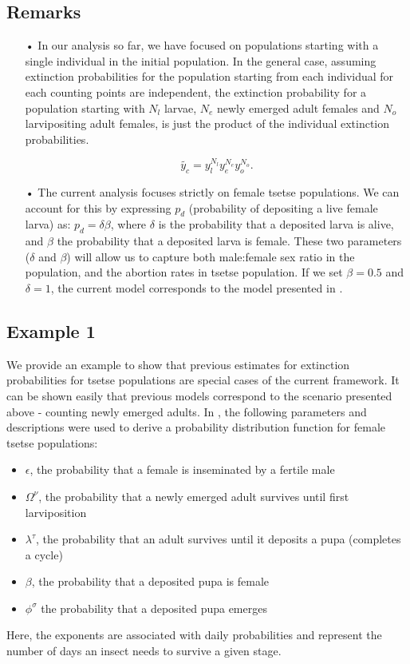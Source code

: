 \documentclass[smallextended]{svjour3}
\begin{document}
	\subsection*{\bf Remarks}
	\begin{itemize}
		\item[•] In our analysis so far, we have focused on populations starting with a single individual in the initial population. In the general case, assuming extinction probabilities for the population starting from each individual for each counting points are independent, the extinction probability for a population starting with $N_l$ larvae, $N_e$ newly emerged adult females and $N_o$ larvipositing adult females, is just the product of the individual extinction probabilities. 
		
		$$\tilde{y_c}=y_l^{N_l} y_e^{N_e} y_o^{N_o}.$$
		
		\item[•] The current analysis focuses strictly on female tsetse populations. We can account for this  by expressing  $p_d$ (probability of depositing a live female larva) as:  $p_d =\delta \beta$, where $\delta$ is the probability that a deposited larva is alive, and $\beta$ the probability that a deposited larva is female.  These two parameters ($\delta$ and $\beta$) will allow us to capture both male:female sex ratio in the population, and  the abortion rates in tsetse population.  If we set $\beta = 0.5$ and $\delta = 1$, the current model corresponds to the model presented in \cite{Hargrove2005a}. 
	\end{itemize}
	
	\subsection{Example 1}
	
	We provide an example to show that previous estimates for extinction probabilities for tsetse populations are special cases of the current framework. It can be shown easily that previous models \cite{Hargrove2005a,Kajunguri2019,Are2019} correspond to the scenario presented above - counting newly emerged adults. In \cite{Are2019}, the following parameters and descriptions were used to derive a probability distribution function for female tsetse populations: 
	\begin{itemize}
		\item $\epsilon$, the probability that a female is inseminated by a fertile male 
		\item $\Omega^{\nu}$,  the probability that a newly emerged adult survives until first larviposition
		\item $ \lambda^{\tau}$, the probability that an adult survives until it deposits a pupa (completes a cycle)
		\item $\beta$,  the probability that a deposited pupa is female 
		\item $\phi^{\sigma}$  the probability that a deposited pupa emerges
	\end{itemize}
	Here, the exponents are associated with daily probabilities and represent the number of days an insect needs to survive a given stage.
	
\end{document}

